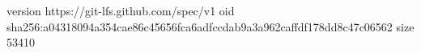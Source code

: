 version https://git-lfs.github.com/spec/v1
oid sha256:a04318094a354cae86c45656fca6adfccdab9a3a962caffdf178dd8c47c06562
size 53410
